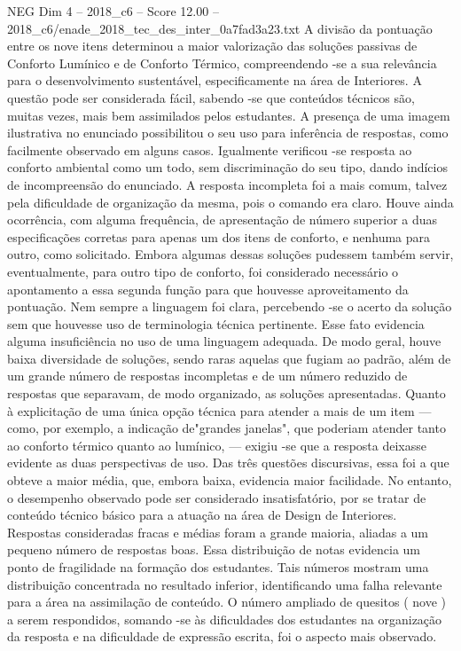 \begin{textsample}{NEG Dim 4 – 2018\_c6 – Score 12.00 – 2018\_c6/enade\_2018\_tec\_des\_inter\_0a7fad3a23.txt}
A divisão da pontuação entre os nove itens determinou a maior valorização das soluções passivas de Conforto Lumínico e de Conforto Térmico, compreendendo -se a sua relevância para o desenvolvimento sustentável, especificamente na área de Interiores.
A questão pode ser considerada fácil, sabendo -se que conteúdos técnicos são, muitas vezes, mais bem assimilados pelos estudantes.
A presença de uma imagem ilustrativa no enunciado possibilitou o seu uso para inferência de respostas, como facilmente observado em alguns casos.
Igualmente verificou -se resposta ao conforto ambiental como um todo, sem discriminação do seu tipo, dando indícios de incompreensão do enunciado.
A resposta incompleta foi a mais comum, talvez pela dificuldade de organização da mesma, pois o comando era claro.
Houve ainda ocorrência, com alguma frequência, de apresentação de número superior a duas especificações corretas para apenas um dos itens de conforto, e nenhuma para outro, como solicitado.
Embora algumas dessas soluções pudessem também servir, eventualmente, para outro tipo de conforto, foi considerado necessário o apontamento a essa segunda função para que houvesse aproveitamento da pontuação.
Nem sempre a linguagem foi clara, percebendo -se o acerto da solução sem que houvesse uso de terminologia técnica pertinente.
Esse fato evidencia alguma insuficiência no uso de uma linguagem adequada.
De modo geral, houve baixa diversidade de soluções, sendo raras aquelas que fugiam ao padrão, além de um grande número de respostas incompletas e de um número reduzido de respostas que separavam, de modo organizado, as soluções apresentadas.
Quanto à explicitação de uma única opção técnica para atender a mais de um item — como, por exemplo, a indicação de"grandes janelas", que poderiam atender tanto ao conforto térmico quanto ao lumínico, — exigiu -se que a resposta deixasse evidente as duas perspectivas de uso.
Das três questões discursivas, essa foi a que obteve a maior média, que, embora baixa, evidencia maior facilidade.
No entanto, o desempenho observado pode ser considerado insatisfatório, por se tratar de conteúdo técnico básico para a atuação na área de Design de Interiores.
Respostas consideradas fracas e médias foram a grande maioria, aliadas a um pequeno número de respostas boas.
Essa distribuição de notas evidencia um ponto de fragilidade na formação dos estudantes.
Tais números mostram uma distribuição concentrada no resultado inferior, identificando uma falha relevante para a área na assimilação de conteúdo.
O número ampliado de quesitos ( nove ) a serem respondidos, somando -se às dificuldades dos estudantes na organização da resposta e na dificuldade de expressão escrita, foi o aspecto mais observado.

\end{textsample}
